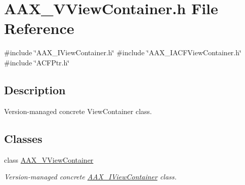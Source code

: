 \hypertarget{a00731}{}\section{A\+A\+X\+\_\+\+V\+View\+Container.\+h File Reference}
\label{a00731}
{\ttfamily \#include \char`\"{}A\+A\+X\+\_\+\+I\+View\+Container.\+h\char`\"{}}\newline
{\ttfamily \#include \char`\"{}A\+A\+X\+\_\+\+I\+A\+C\+F\+View\+Container.\+h\char`\"{}}\newline
{\ttfamily \#include \char`\"{}A\+C\+F\+Ptr.\+h\char`\"{}}\newline


\subsection{Description}
Version-\/managed concrete View\+Container class. 

\subsection*{Classes}
\begin{DoxyCompactItemize}
\item 
class \mbox{\hyperlink{a01945}{A\+A\+X\+\_\+\+V\+View\+Container}}
\begin{DoxyCompactList}\small\item\em Version-\/managed concrete \mbox{\hyperlink{a01889}{A\+A\+X\+\_\+\+I\+View\+Container}} class. \end{DoxyCompactList}\end{DoxyCompactItemize}

